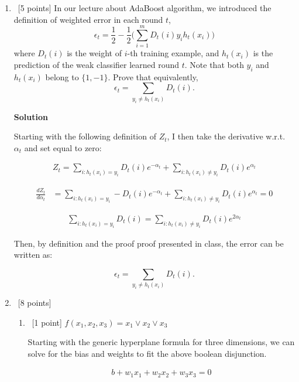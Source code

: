 \documentclass[12pt, fullpage,letterpaper]{article}
\newcommand{\solution}{\textbf{\large Solution}}
\begin{document}
\begin{enumerate}
\begin{enumerate}
	
\end{enumerate}

\item~[5 points] In our lecture about AdaBoost algorithm, we introduced the definition of weighted error in each round $t$, 
\[
\epsilon_t = \frac{1}{2} - \frac{1}{2}\big(\sum_{i=1}^m D_t(i) y_i h_t(x_i)\big)
\]
where $D_t(i)$ is the weight of $i$-th training example, and $h_t(x_i)$ is the prediction of the weak classifier learned round $t$. Note that both $y_i$ and $h_t(x_i)$ belong to $\{1, -1\}$. Prove that equivalently,
\[
\epsilon_t = \sum_{y_i \neq h_t(x_i)} D_t(i).
\]

\solution

	Starting with the following definition of $Z_t$, I then take the derivative w.r.t. $\alpha_t$ and set equal to zero:
	
	\[
		\begin{split}
			Z_t = \sum_{i:h_t(x_i)=y_i} D_t(i)e^{-\alpha_t} + 	\sum_{i:h_t(x_i)\neq y_i} D_t(i)e^{\alpha_t}		
		\end{split}	
	\]
	
	\[
		\begin{split}
			\frac{dZ_t}{d\alpha_t} &= \sum_{i:h_t(x_i)=y_i} - D_t(i)e^{-\alpha_t} + 	\sum_{i:h_t(x_i)\neq y_i} D_t(i)e^{\alpha_t} = 0		
		\end{split}	
	\]
	
	\[
		\begin{split}
			 \sum_{i:h_t(x_i)=y_i} D_t(i) = 	\sum_{i:h_t(x_i)\neq y_i} D_t(i)e^{2\alpha_t} 
		\end{split}	
	\]
	
	Then, by definition and the proof proof presented in class, the error can be written as:
	
	\[
		\epsilon_t = \sum_{y_i \neq h_t(x_i)} D_t(i).
	\]
	


	\item~[8 points] 
	\begin{enumerate}
		\item~[1 point] $f(x_1, x_2, x_3) = x_1 \lor x_2 \lor x_3$
		
			Starting with the generic hyperplane formula for three dimensions, we can solve for the bias and weights to fit the above boolean disjunction.
			
			\[
				\begin{split}
					b + w_1 x_1 + w_2 x_2 + w_3 x_3 = 0
				\end{split}
			\]
			

\end{enumerate}
\end{enumerate}
\end{document}
